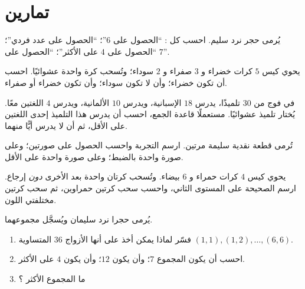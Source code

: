 \section{تمارين}

\begin{exercise}[$\star$]\label{exo:g10:proba:1}
يُرمى حجر نرد سليم. احسب  كل : ``الحصول على
$6$''؛ ``الحصول على عدد فردي''؛ ``الحصول على $4$ على الأكثر''؛ ``الحصول على
$7$''.
\end{exercise}

\begin{exercise}[$\star$]\label{exo:g10:proba:2}
يحوي كيس $5$ كرات خضراء و $3$ صفراء و $2$ سوداء؛ وتُسحب كرة واحدة
عشوائيًا. احسب  أن تكون خضراء؛ وأن لا تكون سوداء؛ وأن تكون
خضراء أو صفراء.
\end{exercise}

\begin{exercise}[$\star$]\label{exo:g10:proba:3}
في فوج من $30$ تلميذًا، يدرس $18$ الإسبانية، ويدرس $10$ الألمانية، ويدرس
$4$ اللغتين معًا. يُختار تلميذ عشوائيًا. مستعملًا قاعدة الجمع،
احسب  أن يدرس هذا التلميذ إحدى اللغتين على الأقل،
ثم  أن لا يدرس أيًّا منهما.
\end{exercise}

\begin{exercise}[$\star$]\label{exo:g10:proba:4}
تُرمى قطعة نقدية سليمة مرتين. ارسم  التجربة واحسب
 الحصول على صورتين؛ وعلى صورة واحدة بالضبط؛ وعلى صورة واحدة
على الأقل.
\end{exercise}

\begin{exercise}[$\star\star$]\label{exo:g10:proba:5}
يحوي كيس $4$ كرات حمراء و $6$ بيضاء. وتُسحب كرتان واحدة بعد
الأخرى \emph{دون} إرجاع. ارسم 
الصحيحة على المستوى الثاني، واحسب  سحب
كرتين حمراوين، ثم  سحب كرتين مختلفتي اللون.
\end{exercise}

\begin{exercise}[$\star\star$]\label{exo:g10:proba:6}
يُرمى حجرا نرد سليمان ويُسجَّل مجموعهما.
\begin{enumerate}
  \item فسّر لماذا يمكن أخذ  على أنها الأزواج $36$
        المتساوية  $(1,1), (1,2), \dots, (6,6)$.
  \item احسب  أن يكون المجموع $7$؛ وأن يكون $12$؛
        وأن يكون $4$ على الأكثر.
  \item ما المجموع الأكثر ؟
\end{enumerate}
\end{exercise}

